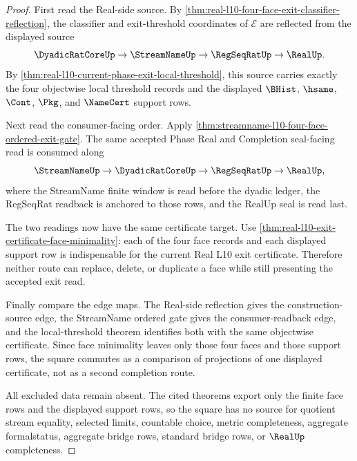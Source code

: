 \begin{proof}
First read the Real-side source. By \autoref{thm:real-l10-four-face-exit-classifier-reflection}, the classifier and exit-threshold coordinates of $\mathcal E$ are reflected from the displayed source
$$
\DyadicRatCoreUp \to \StreamNameUp \to \RegSeqRatUp \to \RealUp.
$$
By \autoref{thm:real-l10-current-phase-exit-local-threshold}, this source carries exactly the four objectwise local threshold records and the displayed $\BHist$, $\hsame$, $\Cont$, $\Pkg$, and $\NameCert$ support rows.

Next read the consumer-facing order. Apply \autoref{thm:streamname-l10-four-face-ordered-exit-gate}. The same accepted Phase Real and Completion seal-facing read is consumed along
$$
\StreamNameUp \to \DyadicRatCoreUp \to \RegSeqRatUp \to \RealUp,
$$
where the StreamName finite window is read before the dyadic ledger, the RegSeqRat readback is anchored to those rows, and the RealUp seal is read last.

The two readings now have the same certificate target. Use \autoref{thm:real-l10-exit-certificate-face-minimality}: each of the four face records and each displayed support row is indispensable for the current Real L10 exit certificate. Therefore neither route can replace, delete, or duplicate a face while still presenting the accepted exit read.

Finally compare the edge maps. The Real-side reflection gives the construction-source edge, the StreamName ordered gate gives the consumer-readback edge, and the local-threshold theorem identifies both with the same objectwise certificate. Since face minimality leaves only those four faces and those support rows, the square commutes as a comparison of projections of one displayed certificate, not as a second completion route.

All excluded data remain absent. The cited theorems export only the finite face rows and the displayed support rows, so the square has no source for quotient stream equality, selected limits, countable choice, metric completeness, aggregate formalstatus, aggregate bridge rows, standard bridge rows, or $\RealUp$ completeness.
\end{proof}

